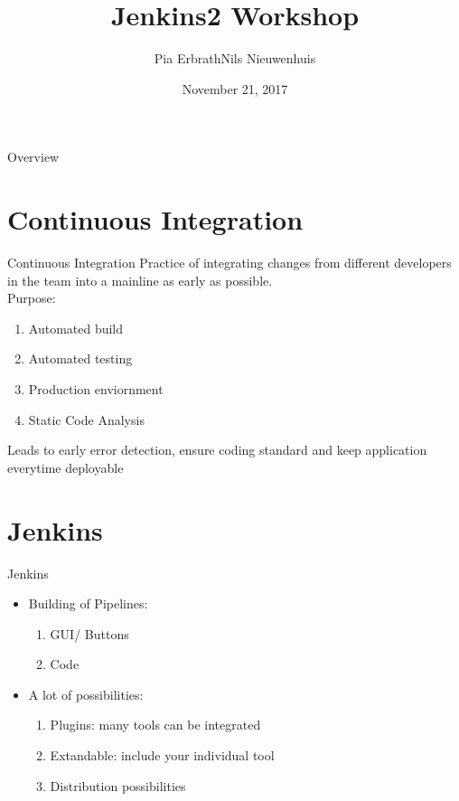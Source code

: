 \documentclass[utf8, a4paper]{beamer}
\title
  [Jenkins2]
  {Jenkins2 Workshop}
\author
  [Erbrath, Nieuwnhuis]
  {Pia Erbrath\quad Nils Nieuwenhuis}
\date
  {November 21, 2017}
\institute
  {SeBi Venlo}
\begin{document}
\maketitle

\begin{frame}{Overview}

  \tableofcontents

\end{frame}

\section{Continuous Integration}

\begin{frame}
  {Continuous Integration}
Practice of integrating changes from different developers in the team into a mainline as early as possible. \\
Purpose:
			\begin{enumerate}
			\item Automated build
			\item Automated testing
			\item Production enviornment
			\item Static Code Analysis
			\end{enumerate}
Leads to early error detection, ensure coding standard and keep application everytime deployable

\end{frame}

\section{Jenkins}
\begin{frame}
	{Jenkins}
	\begin{itemize}
		\item Building of Pipelines:
			\begin{enumerate}
			\item GUI/ Buttons
			\item Code
			\end{enumerate}
		\item A lot of possibilities:
			\begin{enumerate}
			\item Plugins: many tools can be integrated
			\item Extandable: include your individual tool
			\item Distribution possibilities
			\end{enumerate}
	\end{itemize}
	
\end{frame}
\end{document}
